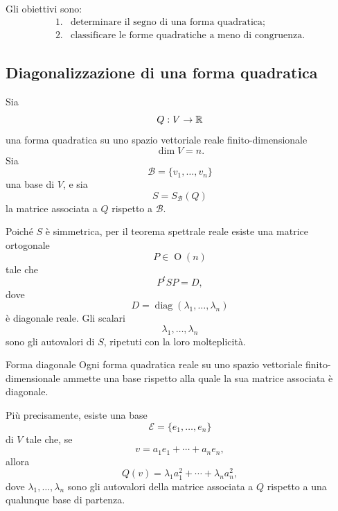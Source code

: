 \documentclass[a4paper]{article}
\begin{document}
Gli obiettivi sono:
\[
    \begin{array}{ll}
        \text{1.} & \text{determinare il segno di una forma quadratica;}\\[1mm]
        \text{2.} & \text{classificare le forme quadratiche a meno di congruenza.}
    \end{array}
\]

\subsection{Diagonalizzazione di una forma quadratica}

Sia
\[
    Q:V\to\mathbb{R}
\]
una forma quadratica su uno spazio vettoriale reale finito-dimensionale
\[
    \dim V=n.
\]
Sia
\[
    \mathcal{B}=\{v_1,\ldots,v_n\}
\]
una base di \(V\), e sia
\[
    S=S_{\mathcal{B}}(Q)
\]
la matrice associata a \(Q\) rispetto a \(\mathcal{B}\).

Poiché \(S\) è simmetrica, per il teorema spettrale reale esiste una matrice ortogonale
\[
    P\in\operatorname{O}(n)
\]
tale che
\[
    P^tSP=D,
\]
dove
\[
    D=
    \operatorname{diag}(\lambda_1,\ldots,\lambda_n)
\]
è diagonale reale. Gli scalari
\[
    \lambda_1,\ldots,\lambda_n
\]
sono gli autovalori di \(S\), ripetuti con la loro molteplicità.

\begin{snippetproposition}{Forma diagonale}
    Ogni forma quadratica reale su uno spazio vettoriale finito-dimensionale ammette una base rispetto alla quale la sua matrice associata è diagonale.

    Più precisamente, esiste una base
    \[
        \mathcal{E}=\{e_1,\ldots,e_n\}
    \]
    di \(V\) tale che, se
    \[
        v=a_1e_1+\cdots+a_ne_n,
    \]
    allora
    \[
        Q(v)=\lambda_1a_1^2+\cdots+\lambda_na_n^2,
    \]
    dove \(\lambda_1,\ldots,\lambda_n\) sono gli autovalori della matrice associata a \(Q\) rispetto a una qualunque base di partenza.
\end{snippetproposition}
\end{document}
